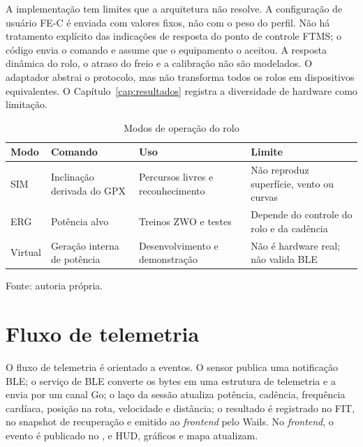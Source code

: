 A implementação tem limites que a arquitetura não resolve. A configuração de
usuário FE-C é enviada com valores fixos, não com o peso do perfil. Não há
tratamento explícito das indicações de resposta do ponto de controle FTMS; o
código envia o comando e assume que o equipamento o aceitou. A resposta
dinâmica do rolo, o atraso do freio e a calibração não são modelados. O
adaptador abstrai o protocolo, mas não transforma todos os rolos em
dispositivos equivalentes. O Capítulo~\ref{cap:resultados} registra a
diversidade de hardware como limitação.

\begin{table}[htbp]
    \centering
    \caption{Modos de operação do rolo}
    \label{tab:modos-treinador}
    \small
    \begin{tabular}{@{}>{\raggedright\arraybackslash}p{2.2cm}
        >{\raggedright\arraybackslash}p{4.6cm}
        >{\raggedright\arraybackslash}p{3.4cm}
        >{\raggedright\arraybackslash}p{4.2cm}@{}}
        \toprule
        \textbf{Modo} & \textbf{Comando} & \textbf{Uso} & \textbf{Limite} \\
        \midrule
        SIM & Inclinação derivada do GPX & Percursos livres e reconhecimento &
        Não reproduz superfície, vento ou curvas \\
        ERG & Potência alvo & Treinos ZWO e testes & Depende do controle do
        rolo e da cadência \\
        Virtual & Geração interna de potência & Desenvolvimento e demonstração &
        Não é hardware real; não valida BLE \\
        \bottomrule
    \end{tabular}
    \vspace{0.2cm}
    \par\small Fonte: autoria própria.
\end{table}

\section{Fluxo de telemetria}
\label{sec:diagrama-telemetria}

O fluxo de telemetria é orientado a eventos. O sensor publica uma notificação
BLE; o serviço de BLE converte os bytes em uma estrutura de telemetria e a
envia por um canal Go; o laço da sessão atualiza potência, cadência,
frequência cardíaca, posição na rota, velocidade e distância; o resultado é
registrado no FIT, no snapshot de recuperação e emitido ao \textit{frontend}
pelo Wails. No \textit{frontend}, o evento é publicado no
, e HUD, gráficos e mapa atualizam.

